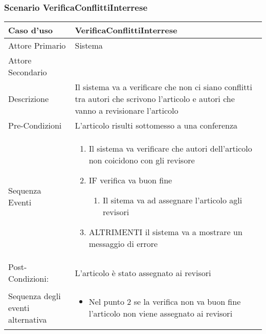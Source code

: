 \subsubsection{Scenario VerificaConflittiInterrese}
\begin{tabular}{|p{3cm}|p{7cm}|}
\hline 
\rowcolor{Orchid}
Caso d'uso & VerificaConflittiInterrese \\
\hline
Attore Primario & Sistema\\
\hline
Attore Secondario & \\
\hline
Descrizione & Il sistema va a verificare che non ci siano conflitti tra autori che scrivono l'articolo e autori che vanno a revisionare l'articolo\\
\hline
Pre-Condizioni& L'articolo risulti sottomesso a una conferenza\\
\hline
  Sequenza Eventi&
                  \begin{enumerate}
                   \item Il sistema va verificare che autori dell'articolo non coicidono con gli revisore
                   \item IF verifica va buon fine
                    \begin{enumerate}
                      \item Il sitema va ad assegnare l'articolo agli revisori
                    \end{enumerate}
                    \item ALTRIMENTI il sistema va a mostrare un messaggio di errore
                  \end{enumerate}\\
\hline
Post-Condizioni: & L'articolo è stato assegnato ai revisori\\
\hline
Sequenza degli eventi alternativa & \begin{itemize}
  \item Nel punto 2 se la verifica non va buon fine l'articolo non viene assegnato ai revisori
\end{itemize} \\
\hline
\end{tabular}

